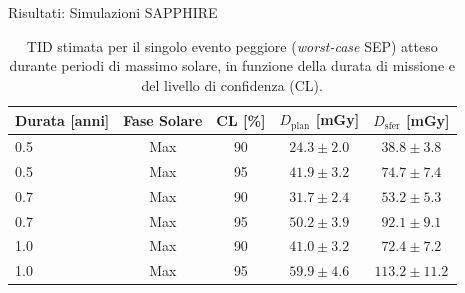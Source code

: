 \documentclass[aspectratio=169]{beamer}
\begin{document}
\begin{frame}{Risultati: Simulazioni SAPPHIRE}
    \centering
    \begin{table}[htbp] 
    \centering
\begin{tabular}{lcccc}
\hline\hline
Durata [anni] & Fase Solare & CL [\%] & $D_\mathrm{plan}$ [mGy] & $D_\mathrm{sfer}$ [mGy] \\
\hline
0.5 & Max & 90 & $24.3 \pm 2.0$ & $38.8 \pm 3.8$ \\
0.5 & Max & 95 & $41.9 \pm 3.2$ & $74.7 \pm 7.4$ \\
0.7 & Max & 90 & $31.7 \pm 2.4$ & $53.2 \pm 5.3$ \\
0.7 & Max & 95 & $50.2 \pm 3.9$ & $92.1 \pm 9.1$ \\
1.0 & Max & 90 & $41.0 \pm 3.2$ & $72.4 \pm 7.2$ \\
1.0 & Max & 95 & $59.9 \pm 4.6$ & $113.2 \pm 11.2$ \\
\hline\hline
\end{tabular}
\caption{TID stimata per il singolo evento peggiore (\textit{worst-case} SEP) atteso durante periodi di massimo solare, in funzione della durata di missione e del livello di confidenza (CL).}
\label{tab:worst_event_doses}
\end{table}
\end{frame}
\end{document}
